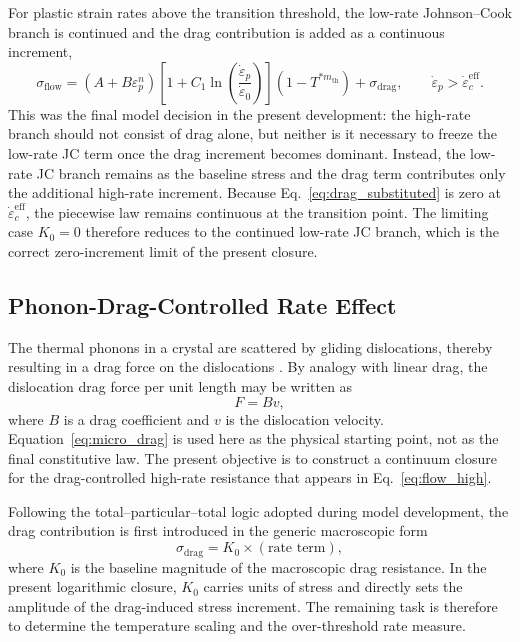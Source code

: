 For plastic strain rates above the transition threshold, the low-rate Johnson--Cook branch is continued and the drag contribution is added as a continuous increment,
\begin{equation}
\sigma_{\mathrm{flow}}=
\left(A+B\varepsilon_p^n\right)
\left[1+C_1\ln\left(\frac{\dot{\varepsilon}_p}{\dot{\varepsilon}_0}\right)\right]
\left(1-T^{*m_{\mathrm{th}}}\right)
+\sigma_{\mathrm{drag}},
\qquad \dot{\varepsilon}_p > \dot{\varepsilon}^{\mathrm{eff}}_c.
\label{eq:flow_high}
\end{equation}
This was the final model decision in the present development: the high-rate branch should not consist of drag alone, but neither is it necessary to freeze the low-rate JC term once the drag increment becomes dominant. Instead, the low-rate JC branch remains as the baseline stress and the drag term contributes only the additional high-rate increment. Because Eq.~\eqref{eq:drag_substituted} is zero at $\dot{\varepsilon}^{\mathrm{eff}}_c$, the piecewise law remains continuous at the transition point. The limiting case $K_0=0$ therefore reduces to the continued low-rate JC branch, which is the correct zero-increment limit of the present closure.

\subsection{Phonon-Drag-Controlled Rate Effect}
The thermal phonons in a crystal are scattered by gliding dislocations, thereby resulting in a drag force on the dislocations \cite{Blaschke2019PhononWind}. By analogy with linear drag, the dislocation drag force per unit length may be written as
\begin{equation}
F = Bv,
\label{eq:micro_drag}
\end{equation}
where $B$ is a drag coefficient and $v$ is the dislocation velocity. Equation~\eqref{eq:micro_drag} is used here as the physical starting point, not as the final constitutive law. The present objective is to construct a continuum closure for the drag-controlled high-rate resistance that appears in Eq.~\eqref{eq:flow_high}.

Following the total--particular--total logic adopted during model development, the drag contribution is first introduced in the generic macroscopic form
\begin{equation}
\sigma_{\mathrm{drag}} = K_0 \times (\text{rate term}),
\label{eq:drag_template}
\end{equation}
where $K_0$ is the baseline magnitude of the macroscopic drag resistance. In the present logarithmic closure, $K_0$ carries units of stress and directly sets the amplitude of the drag-induced stress increment. The remaining task is therefore to determine the temperature scaling and the over-threshold rate measure.

